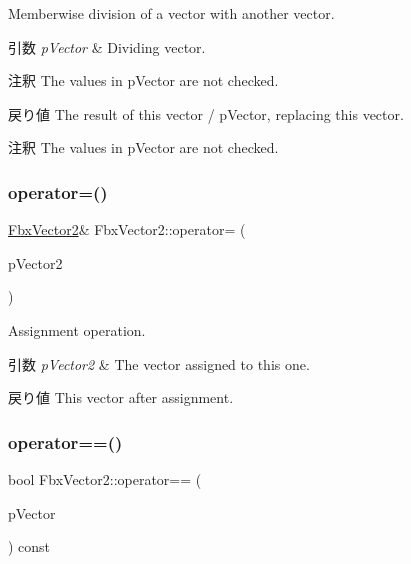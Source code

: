 Memberwise division of a vector with another vector. 
\begin{DoxyParams}{引数}
{\em p\+Vector} & Dividing vector. \\
\hline
\end{DoxyParams}
\begin{DoxyRemark}{注釈}
The values in p\+Vector are not checked. 
\end{DoxyRemark}
\begin{DoxyReturn}{戻り値}
The result of this vector / p\+Vector, replacing this vector. 
\end{DoxyReturn}
\begin{DoxyRemark}{注釈}
The values in p\+Vector are not checked. 
\end{DoxyRemark}
\mbox{\label{class_fbx_vector2_a1133cfe1028a4e62ce6dceb579fd8450}} 
\subsubsection{\texorpdfstring{operator=()}{operator=()}}
{\footnotesize\ttfamily \hyperlink{class_fbx_vector2}{Fbx\+Vector2}\& Fbx\+Vector2\+::operator= (\begin{DoxyParamCaption}\item[{const \hyperlink{class_fbx_vector2}{Fbx\+Vector2} \&}]{p\+Vector2 }\end{DoxyParamCaption})}

Assignment operation. 
\begin{DoxyParams}{引数}
{\em p\+Vector2} & The vector assigned to this one. \\
\hline
\end{DoxyParams}
\begin{DoxyReturn}{戻り値}
This vector after assignment. 
\end{DoxyReturn}
\mbox{\label{class_fbx_vector2_a4196aa8199019d572c3b01c1521778d5}} 
\subsubsection{\texorpdfstring{operator==()}{operator==()}}
{\footnotesize\ttfamily bool Fbx\+Vector2\+::operator== (\begin{DoxyParamCaption}\item[{const \hyperlink{class_fbx_vector2}{Fbx\+Vector2} \&}]{p\+Vector }\end{DoxyParamCaption}) const}

